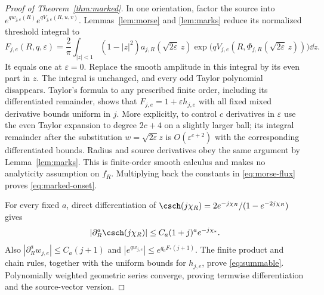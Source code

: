 \begin{proof}[Proof of Theorem~\ref{thm:marked}]
In one orientation, factor the source into
$e^{qw_{j,e}(R)}e^{qV_{j,e}(R,u,v)}$. Lemmas~\ref{lem:morse} and
\ref{lem:marks} reduce its normalized threshold integral to
\begin{equation}\label{eq:normalized-source}
 F_{j,e}(R,q,\varepsilon)=\frac2\pi
 \int_{|z|<1}(1-|z|^2)
 a_{j,R}(\sqrt{2\varepsilon}\,z)
 \exp\bigl(qV_{j,e}(R,\Phi_{j,R}(\sqrt{2\varepsilon}\,z))\bigr)\dd z.
\end{equation}
It equals one at $\varepsilon=0$. Replace the smooth amplitude in this
integral by its even part in $z$. The integral is unchanged, and every
odd Taylor polynomial disappears. Taylor's formula to any prescribed
finite order, including its differentiated remainder, shows that
$F_{j,e}=1+\varepsilon h_{j,e}$ with all fixed mixed derivative bounds
uniform in $j$. More explicitly, to control $c$ derivatives in
$\varepsilon$ use the even Taylor expansion to degree $2c+4$ on a
slightly larger ball; its integral remainder after the substitution
$w=\sqrt{2\varepsilon}z$ is $O(\varepsilon^{c+2})$ with the
corresponding differentiated bounds. Radius and source derivatives
obey the same argument by Lemma~\ref{lem:marks}. This is finite-order
smooth calculus and makes no analyticity assumption on $f_R$.
Multiplying back the constants in \eqref{eq:morse-flux} proves
\eqref{eq:marked-onset}.

For every fixed $a$, direct differentiation of
$\csch(j\chi_R)=2e^{-j\chi_R}/(1-e^{-2j\chi_R})$ gives
\[
 |\partial_R^a\csch(j\chi_R)|
 \le C_a(1+j)^a e^{-j\chi_*}.
\]
Also $|\partial_R^a w_{j,e}|\le C_a(j+1)$ and
$|e^{qw_{j,e}}|\le e^{q_0F_*(j+1)}$.
The finite product and chain rules, together with the uniform bounds
for $h_{j,e}$, prove \eqref{eq:summable}. Polynomially weighted
geometric series converge, proving termwise differentiation and the
source-vector version.
\end{proof}

